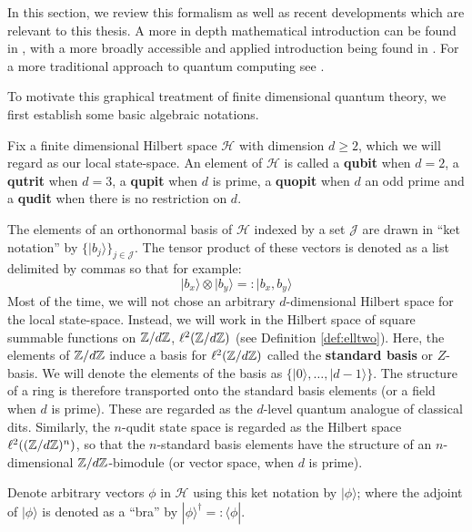 In this section, we  review this formalism as well as recent developments which are relevant to this thesis.  A more in depth mathematical introduction can be found in \cite{heunen}, with a more broadly accessible and applied introduction being found in \cite{pqp}.  For a more traditional approach to quantum computing see \cite{nielsen}.


To motivate this graphical treatment of finite dimensional quantum theory, we first establish some basic algebraic notations.


Fix a finite dimensional Hilbert space $\mathcal H$ with dimension $d\geq 2$, which we will regard as our local state-space. An element of  $\mathcal H$ is called a {\bf qubit} when $d=2$, a {\bf qutrit} when $d=3$, a {\bf qupit} when $d$ is  prime, a {\bf quopit} when $d$ an odd prime and  a {\bf qudit} when there is no restriction on $d$.

The elements of an orthonormal basis of $\mathcal H$ indexed by a set $\mathcal J$ are drawn in ``ket notation'' by $\{|b_{j}\rangle \}_{j \in \mathcal J}$.
The tensor product of these vectors is denoted as a list delimited by commas so that for example:
$$
| b_x \rangle \otimes | b_y\rangle =: |b_x,b_y \rangle  
$$
Most of the time,  we will not chose an arbitrary $d$-dimensional Hilbert space for the local state-space.  Instead, we will work in the Hilbert space of square summable functions on $\mathbb{Z}/d\mathbb{Z}$, $\ell^2(\mathbb{Z}/d\mathbb{Z})$ (see Definition \ref{def:elltwo}).  Here, the elements of $\mathbb{Z}/d\mathbb{Z}$ induce a basis for  $\ell^2(\mathbb{Z}/d\mathbb{Z})$ called the {\bf standard basis} or $Z$-basis.  We will denote the elements of the basis  as  $\{| 0\rangle , \ldots, |d-1\rangle \}$.  The structure of a ring is therefore transported onto the standard basis elements (or a field when $d$ is prime).  These are regarded as the $d$-level quantum analogue of classical dits.    Similarly, the $n$-qudit state space is regarded as the Hilbert space $\ell^2((\mathbb{Z}/d\mathbb{Z})^n)$, so that the $n$-standard basis elements have the structure of an $n$-dimensional $\mathbb{Z}/d\mathbb{Z}$-bimodule (or vector space, when $d$ is prime).

Denote arbitrary vectors $\phi$ in $\mathcal H$ using this ket notation by $|\phi \rangle$; where the adjoint of $|\phi \rangle$ is denoted as a ``bra''  by $|\phi \rangle^\dag =: \langle \phi |$. 

